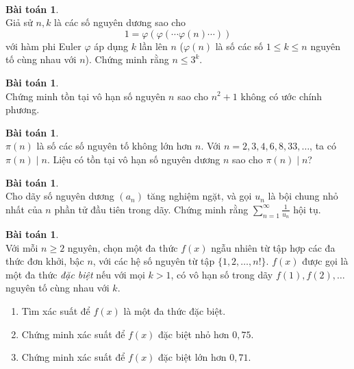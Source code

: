 \documentclass{article}
\theoremstyle{definition}
\newtheorem{exercise}[theorem]{Bài toán}
\begin{document}
\ \\
\begin{exercise} \ \\
Giả sử $n, k$ là các số nguyên dương sao cho
$$1 = \varphi(\varphi(\cdots \varphi(n) \cdots))$$
với hàm phi Euler $\varphi$ áp dụng $k$ lần lên $n$ ($\varphi(n)$ là số các số $1 \leq k \leq n$ nguyên tố cùng nhau với $n$). Chứng minh rằng $n \leq 3^k$.
\end{exercise}
\begin{exercise} \ \\
Chứng minh tồn tại vô hạn số nguyên $n$ sao cho $n^2 + 1$ không có ước chính phương.
\end{exercise}
\begin{exercise} \ \\
$\pi(n)$ là số các số nguyên tố không lớn hơn $n$. Với $n = 2, 3, 4, 6, 8, 33, \hdots$, ta có $\pi(n) \mid n$. Liệu có tồn tại vô hạn số nguyên dương $n$ sao cho $\pi(n) \mid n$?
\end{exercise}
\begin{exercise} \ \\
Cho dãy số nguyên dương $(a_n)$ tăng nghiệm ngặt, và gọi $u_n$ là bội chung nhỏ nhất của $n$ phần tử đầu tiên trong dãy. Chứng minh rằng $\sum_{n = 1}^\infty \frac{1}{u_n}$ hội tụ.
\end{exercise}
\begin{exercise} \ \\
Với mỗi $n \geq 2$ nguyên, chọn một đa thức $f(x)$ ngẫu nhiên từ tập hợp các đa thức đơn khởi, bậc $n$, với các hệ số nguyên từ tập $\{ 1, 2, \hdots, n! \}$. $f(x)$ được gọi là một đa thức \textit{đặc biệt} nếu với mọi $k > 1$, có vô hạn số trong dãy $f(1), f(2), \hdots$ nguyên tố cùng nhau với $k$.
\begin{enumerate}
	\item Tìm xác suất để $f(x)$ là một đa thức đặc biệt.
	\item Chứng minh xác suất để $f(x)$ đặc biệt nhỏ hơn $0,75$.
	\item Chứng minh xác suất để $f(x)$ đặc biệt lớn hơn $0,71$.
\end{enumerate}
\end{exercise}

\newpage
\end{document}
